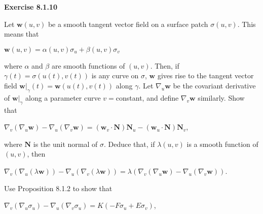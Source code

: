 \documentclass[12pt, a4paper]{article}
\begin{document}
\begin{flushleft}
    \textbf{Exercise 8.1.10}
    
\vspace{4mm}

    Let $\mathbf{w}(u,v)$ be a smooth tangent vector field on a surface patch $\sigma(u,v)$. This means that\par
    
\vspace{4mm}
    
        \centerline{$\mathbf{w}(u,v)=\alpha(u,v)\sigma_u+\beta(u,v)\sigma_v$}
        
\vspace{4mm}

    where $\alpha$ and $\beta$ are smooth functions of $(u,v)$. Then, if $\gamma(t)=\sigma(u(t),v(t))$ is any curve on $\sigma$, $\mathbf{w}$ gives rise to the tangent vector field $\mathbf{w}|_{\gamma}(t)=\mathbf{w}(u(t),v(t))$ along $\gamma$. Let $\nabla_u\mathbf{w}$ be the covariant derivative of $\mathbf{w}|_{\gamma}$ along a parameter curve $v=$constant, and define $\nabla_v\mathbf{w}$ similarly. Show that\par
    
\vspace{4mm}

        \centerline{$\nabla_v(\nabla_u\mathbf{w})-\nabla_u(\nabla_v\mathbf{w})=(\mathbf{w}_v\cdot\mathbf{N})\mathbf{N}_u-(\mathbf{w}_u\cdot\mathbf{N})\mathbf{N}_v$,}
        
\vspace{4mm}

    where $\mathbf{N}$ is the unit normal of $\sigma$. Deduce that, if $\lambda(u,v)$ is a smooth function of $(u,v)$, then\par
    
\vspace{4mm}

        \centerline{$\nabla_v(\nabla_u(\lambda\mathbf{w}))-\nabla_u(\nabla_v(\lambda\mathbf{w}))=\lambda(\nabla_v(\nabla_u\mathbf{w})-\nabla_u(\nabla_v\mathbf{w}))$.}
        
\vspace{4mm}

    Use Proposition 8.1.2 to show that\par
    
\vspace{4mm}

        \centerline{$\nabla_v(\nabla_u\sigma_u)-\nabla_u(\nabla_v\sigma_u)=K(-F\sigma_u+E\sigma_v)$,}
        

\end{flushleft}
\end{document}
